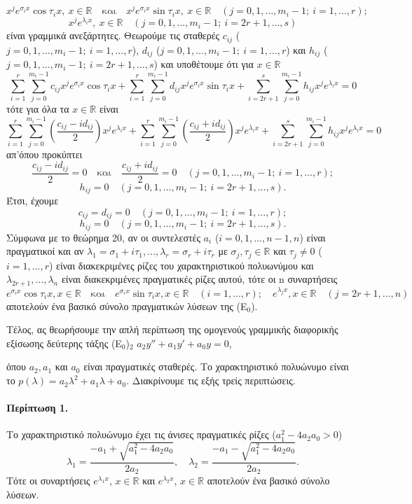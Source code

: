 \documentclass[11pt,a4paper,twoside]{book}
\begin{document}
\[
    x^j e^{\sigma_i x}\cos\tau_i x, \ x\in\mathbb{R} \quad \text{και} \quad x^j e^{\sigma_i x}\sin\tau_i x, \ x\in\mathbb{R} \quad (j=0,1,\dots,m_i-1; \ i=1,\dots,r);
\]
\[
    x^j e^{\lambda_i x}, \ x\in\mathbb{R} \quad (j=0,1,\dots,m_i-1; \ i=2r+1,\dots,s)
\]
είναι γραμμικά ανεξάρτητες. Θεωρούμε τις σταθερές $c_{ij}$ ($j=0,1,\dots,m_i-1; \ i=1,\dots,r$), $d_{ij}$ ($j=0,1,\dots,m_i-1; \ i=1,\dots,r$) και $h_{ij}$ ($j=0,1,\dots,m_i-1; \ i=2r+1,\dots,s$) και υποθέτουμε ότι για $x\in\mathbb{R}$
\[
    \sum_{i=1}^r \sum_{j=0}^{m_i-1} c_{ij} x^j e^{\sigma_i x}\cos\tau_i x + \sum_{i=1}^r \sum_{j=0}^{m_i-1} d_{ij} x^j e^{\sigma_i x}\sin\tau_i x + \sum_{i=2r+1}^s \sum_{j=0}^{m_i-1} h_{ij} x^j e^{\lambda_i x} = 0
\]
τότε για όλα τα $x\in\mathbb{R}$ είναι
\[
    \sum_{i=1}^r \sum_{j=0}^{m_i-1} \left(\frac{c_{ij}-id_{ij}}{2}\right)x^j e^{\lambda_i x} + \sum_{i=1}^r \sum_{j=0}^{m_i-1} \left(\frac{c_{ij}+id_{ij}}{2}\right)x^j e^{\bar{\lambda}_i x} + \sum_{i=2r+1}^s \sum_{j=0}^{m_i-1} h_{ij} x^j e^{\lambda_i x} = 0
\]
απ'όπου προκύπτει
\[
    \frac{c_{ij}-id_{ij}}{2}=0 \quad \text{και} \quad \frac{c_{ij}+id_{ij}}{2}=0 \quad (j=0,1,\dots,m_i-1; \ i=1,\dots,r);
\]
\[
    h_{ij}=0 \quad (j=0,1,\dots,m_i-1; \ i=2r+1,\dots,s).
\]
Έτσι, έχουμε
\[
    c_{ij}=d_{ij}=0 \quad (j=0,1,\dots,m_i-1; \ i=1,\dots,r);
\]
\[
    h_{ij}=0 \quad (j=0,1,\dots,m_i-1; \ i=2r+1,\dots,s).
\]
Σύμφωνα με το θεώρημα 20, αν οι συντελεστές $a_i$ ($i=0,1,\dots,n-1,n$) είναι πραγματικοί και αν $\lambda_1=\sigma_1+i\tau_1, \dots, \lambda_r=\sigma_r+i\tau_r$ με $\sigma_j, \tau_j\in\mathbb{R}$ και $\tau_j\neq 0$ ($i=1,\dots,r$) είναι διακεκριμένες ρίζες του χαρακτηριστικού πολυωνύμου και $\lambda_{2r+1}, \dots, \lambda_n$ είναι διακεκριμένες πραγματικές ρίζες αυτού, τότε οι n συναρτήσεις
\[
    e^{\sigma_i x}\cos\tau_i x, x\in\mathbb{R} \quad \text{και} \quad e^{\sigma_i x}\sin\tau_i x, x\in\mathbb{R} \quad (i=1,\dots,r); \quad e^{\lambda_j x}, x\in\mathbb{R} \quad (j=2r+1,\dots,n)
\]
αποτελούν ένα βασικό σύνολο πραγματικών λύσεων της (Ε$_0$).

Τέλος, ας θεωρήσουμε την απλή περίπτωση της ομογενούς γραμμικής διαφορικής εξίσωσης δεύτερης τάξης (E$_0$)$_2$ \quad $a_2 y''+a_1 y'+a_0 y=0$,

όπου $a_2, a_1$ και $a_0$ είναι πραγματικές σταθερές. Το χαρακτηριστικό πολυώνυμο είναι το $p(\lambda)=a_2\lambda^2+a_1\lambda+a_0$. Διακρίνουμε τις εξής τρείς περιπτώσεις.

\paragraph{Περίπτωση 1.} Το χαρακτηριστικό πολυώνυμο έχει τις άνισες πραγματικές ρίζες ($a_1^2-4a_2a_0>0$)
\[
    \lambda_1 = \frac{-a_1+\sqrt{a_1^2-4a_2a_0}}{2a_2}, \quad \lambda_2 = \frac{-a_1-\sqrt{a_1^2-4a_2a_0}}{2a_2}.
\]
Τότε οι συναρτήσεις $e^{\lambda_1 x}$, $x\in\mathbb{R}$ και $e^{\lambda_2 x}$, $x\in\mathbb{R}$ αποτελούν ένα βασικό σύνολο λύσεων.
\end{document}
